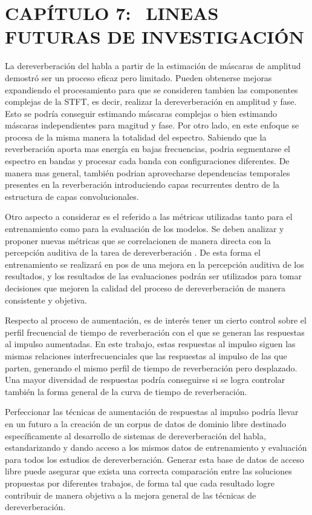 \section[Lineas futuras de investigación]{CAPÍTULO 7:$\ \ \ \ $LINEAS FUTURAS DE INVESTIGACIÓN} 

La dereverberación del habla a partir de la estimación de máscaras de amplitud demostró ser un proceso eficaz pero limitado. Pueden obtenerse mejoras expandiendo el procesamiento para que se consideren tambien las componentes complejas de la STFT, es decir, realizar la dereverberación en amplitud y fase. Esto se podría conseguir estimando máscaras complejas o bien estimando máscaras independientes para magitud y fase. Por otro lado, en este enfoque se procesa de la misma manera la totalidad del espectro. Sabiendo que la reverberación aporta mas energía en bajas frecuencias, podria segmentarse el espectro en bandas y procesar cada banda con configuraciones diferentes. 
De manera mas general, también podrian aprovecharse dependencias temporales presentes en la reverberación introduciendo capas recurrentes dentro de la estructura de capas convolucionales. 

Otro aspecto a considerar es el referido a las métricas utilizadas tanto para el entrenamiento como para la evaluación de los modelos. Se deben analizar y proponer nuevas métricas que se correlacionen de manera directa con la percepción auditiva de la tarea de dereverberación \cite{CDPAM}. De esta forma el entrenamiento se realizará en pos de una mejora en la percepción auditiva de los resultados, y los resultados de las evaluaciones podrán ser utilizados para tomar decisiones que mejoren la calidad del proceso de dereverberación de manera consistente y objetiva.

Respecto al proceso de aumentación, es de interés tener un cierto control sobre el perfil frecuencial de tiempo de reverberación con el que se generan las respuestas al impulso aumentadas. En este trabajo, estas respuestas al impulso siguen las mismas relaciones interfrecuenciales que las respuestas al impulso de las que parten, generando el mismo perfil de tiempo de reverberación pero desplazado. Una mayor diversidad de respuestas podría conseguirse si se logra controlar también la forma general de la curva de tiempo de reverberación. 

Perfeccionar las técnicas de aumentación de respuestas al impulso podría llevar en un futuro a la creación de un corpus de datos de dominio libre destinado específicamente al desarrollo de sistemas de dereverberación del habla, estandarizando y dando acceso a los mismos datos de entrenamiento y evaluación para todos los estudios de dereverberación. Generar esta base de datos de acceso libre puede asegurar que exista una correcta comparación entre las soluciones propuestas por diferentes trabajos, de forma tal que cada resultado logre contribuir de manera objetiva a la mejora general de las técnicas de dereverberación. 